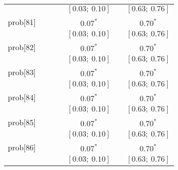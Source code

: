 \begin{table}
\begin{center}
\begin{tabular}{l c c c c c c }
          &                           &                           &                           & $[0.03;\ 0.10]$         &                           & $[0.63;\ 0.76]$       \\
prob[81]  &                           &                           &                           & $0.07^{*}$              &                           & $0.70^{*}$            \\
          &                           &                           &                           & $[0.03;\ 0.10]$         &                           & $[0.63;\ 0.76]$       \\
prob[82]  &                           &                           &                           & $0.07^{*}$              &                           & $0.70^{*}$            \\
          &                           &                           &                           & $[0.03;\ 0.10]$         &                           & $[0.63;\ 0.76]$       \\
prob[83]  &                           &                           &                           & $0.07^{*}$              &                           & $0.70^{*}$            \\
          &                           &                           &                           & $[0.03;\ 0.10]$         &                           & $[0.63;\ 0.76]$       \\
prob[84]  &                           &                           &                           & $0.07^{*}$              &                           & $0.70^{*}$            \\
          &                           &                           &                           & $[0.03;\ 0.10]$         &                           & $[0.63;\ 0.76]$       \\
prob[85]  &                           &                           &                           & $0.07^{*}$              &                           & $0.70^{*}$            \\
          &                           &                           &                           & $[0.03;\ 0.10]$         &                           & $[0.63;\ 0.76]$       \\
prob[86]  &                           &                           &                           & $0.07^{*}$              &                           & $0.70^{*}$            \\
          &                           &                           &                           & $[0.03;\ 0.10]$         &                           & $[0.63;\ 0.76]$       \\

\end{tabular}
\end{center}
\end{table}
